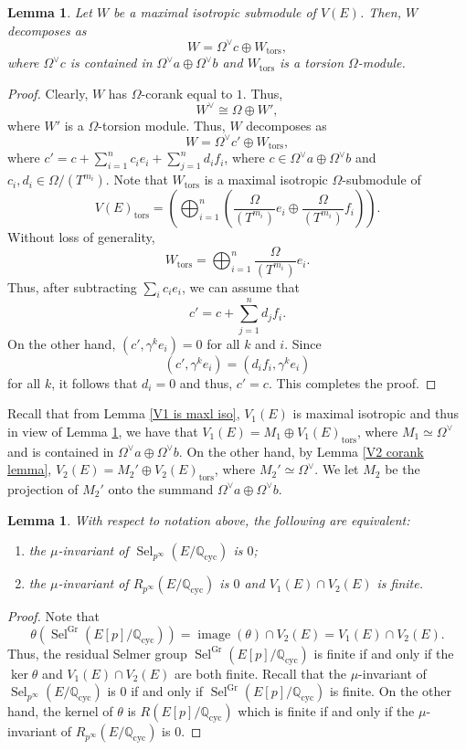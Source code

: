 \documentclass[12pt]{amsart}
\newtheorem{lemma}[theorem]{Lemma}
\newcommand{\Q}{\mathbb{Q}}
\newcommand{\op}[1]{\operatorname{#1}}
\numberwithin{equation}{section}
\begin{document}
\begin{lemma}\label{str of maxl iso}
    Let $W$ be a maximal isotropic submodule of $V(E)$. Then, $W$ decomposes as 
    \[W=\Omega^\vee c\oplus W_{\op{tors}},\] where $\Omega^\vee c$ is contained in $\Omega^\vee a\oplus \Omega^\vee b$ and $W_{\op{tors}}$ is a torsion $\Omega$-module.
\end{lemma}
\begin{proof}
    Clearly, $W$ has $\Omega$-corank equal to $1$. Thus, 
    \[W^\vee \cong \Omega \oplus W',\] where $W'$ is a $\Omega$-torsion module. Thus, $W$ decomposes as 
    \[W=\Omega^\vee c'\oplus W_{\op{tors}},\]
where $c'= c+\sum_{i=1}^n c_i e_i+\sum_{j=1}^n d_i f_i$, where $c\in \Omega^\vee a\oplus \Omega^\vee b$ and $c_i, d_i\in \Omega/(T^{m_i})$. Note that $W_{\op{tors}}$ is a maximal isotropic $\Omega$-submodule of 
\[V(E)_{\op{tors}}=\left(\bigoplus_{i=1}^n \left( \frac{\Omega}{(T^{m_i})} e_i \oplus \frac{\Omega}{(T^{m_i})} f_i\right)\right). \] Without loss of generality, 
\[W_{\op{tors}}=\bigoplus_{i=1}^n \frac{\Omega}{(T^{m_i})} e_i.\]
Thus, after subtracting $\sum_{i} c_i e_i$, we can assume that 
\[c'=c+\sum_{j=1}^n d_j f_i.\] On the other hand, $(c', \gamma^k e_i)=0$ for all $k$ and $i$. Since 
\[(c',\gamma^k e_i)=(d_if_i,\gamma^ke_i)\] for all $k$, it follows that $d_i=0$ and thus, $c'=c$. This completes the proof.
\end{proof}

Recall that from Lemma \ref{V1 is maxl iso}, $V_1(E)$ is maximal isotropic and thus in view of Lemma \ref{str of maxl iso}, we have that $V_1(E)=M_1\oplus V_1(E)_{\op{tors}}$, where $M_1\simeq \Omega^\vee$ and is contained in $\Omega^\vee a\oplus \Omega^\vee b$. On the other hand, by Lemma \ref{V2 corank lemma}, $V_2(E)=M_2'\oplus V_2(E)_{\op{tors}}$, where $M_2'\simeq \Omega^\vee$. We let $M_2$ be the projection of $M_2'$ onto the summand $\Omega^\vee a\oplus \Omega^\vee b$.
\begin{lemma}\label{boring lemma 1}
    With respect to notation above, the following are equivalent:
    \begin{enumerate}
        \item the $\mu$-invariant of $\op{Sel}_{p^\infty}(E/\Q_{\op{cyc}})$ is $0$;
        \item the $\mu$-invariant of $R_{p^\infty}(E/\Q_{\op{cyc}})$ is $0$ and $V_1(E)\cap V_2(E)$ is finite.
    \end{enumerate}
\end{lemma}
\begin{proof}
    Note that \[\theta\left(\op{Sel}^{\op{Gr}}(E[p]/\Q_{\op{cyc}})\right)=\op{image}(\theta)\cap V_2(E)=V_1(E)\cap V_2(E).\] Thus, the residual Selmer group $\op{Sel}^{\op{Gr}}(E[p]/\Q_{\op{cyc}})$ is finite if and only if the $\op{ker}\theta$ and $V_1(E)\cap V_2(E)$ are both finite. Recall that the $\mu$-invariant of $\op{Sel}_{p^\infty}(E/\Q_{\op{cyc}})$ is $0$ if and only if $\op{Sel}^{\op{Gr}}(E[p]/\Q_{\op{cyc}})$ is finite. On the other hand, the kernel of $\theta$ is $R(E[p]/\Q_{\op{cyc}})$ which is finite if and only if the $\mu$-invariant of $R_{p^\infty}(E/\Q_{\op{cyc}})$ is $0$.
\end{proof}
\end{document}
